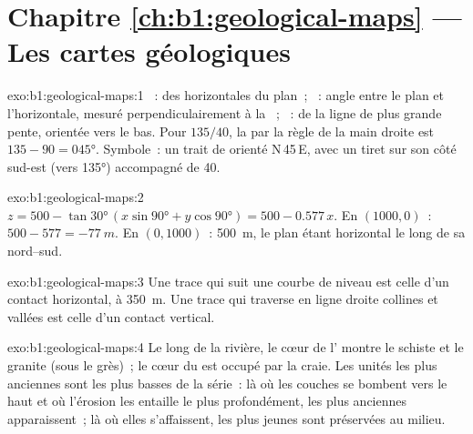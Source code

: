 \section*{Chapitre \ref{ch:b1:geological-maps} --- Les cartes géologiques}

\begin{solution}{exo:b1:geological-maps:1}
~:  des horizontales du plan~; ~: angle entre le plan et
l'horizontale, mesuré perpendiculairement à la ~; ~:
 de la ligne de plus grande pente, orientée vers le bas. Pour $135/40$, la
 par la règle de la main droite est $135 - 90 = \ang{045}$. Symbole~: un
trait de  orienté N\,45\,E, avec un tiret sur son côté sud-est (vers
\ang{135}) accompagné de 40.
\end{solution}

\begin{solution}{exo:b1:geological-maps:2}
$z = 500 - \tan\ang{30}\,(x\sin\ang{90} + y\cos\ang{90}) = 500 - 0.577\,x$.
En $(1000, 0)$~: $500 - 577 = \qty{-77}{m}$. En $(0, 1000)$~: \qty{500}{m}, le
plan étant horizontal le long de sa  nord--sud.
\end{solution}

\begin{solution}{exo:b1:geological-maps:3}
Une trace qui suit une courbe de niveau est celle d'un contact horizontal, à
\qty{350}{m}. Une trace qui traverse en ligne droite collines et vallées est
celle d'un contact vertical.
\end{solution}

\begin{solution}{exo:b1:geological-maps:4}
Le long de la rivière, le cœur de l' montre le schiste et le granite
(sous le grès)~; le cœur du  est occupé par la craie. Les unités les
plus anciennes sont les plus basses de la série~: là où les couches se bombent
vers le haut et où l'érosion les entaille le plus profondément, les plus
anciennes apparaissent~; là où elles s'affaissent, les plus jeunes sont
préservées au milieu.
\end{solution}

